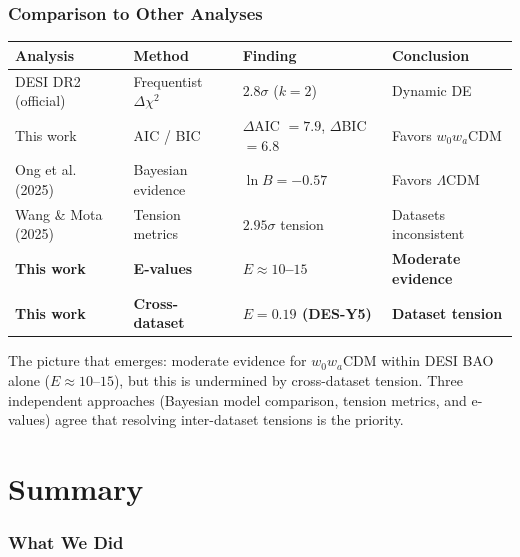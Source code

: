 \documentclass[11pt,a4paper]{article}
\newcommand{\LCDM}{$\Lambda$CDM}
\begin{document}
\section{Comparison to Other Analyses}

\begin{center}
\begin{tabular}{p{3cm}p{3cm}p{3cm}p{3cm}}
\toprule
\textbf{Analysis} & \textbf{Method} & \textbf{Finding} & \textbf{Conclusion} \\
\midrule
DESI DR2 (official) & Frequentist $\Delta\chi^2$ & $2.8\sigma$ ($k=2$) & Dynamic DE \\
This work & AIC / BIC & $\Delta$AIC $= 7.9$, $\Delta$BIC $= 6.8$ & Favors $w_0w_a$CDM \\
Ong et al. (2025) & Bayesian evidence & $\ln B = -0.57$ & Favors \LCDM \\
Wang \& Mota (2025) & Tension metrics & $2.95\sigma$ tension & Datasets inconsistent \\
\textbf{This work} & \textbf{E-values} & \textbf{$E \approx 10$--$15$} & \textbf{Moderate evidence} \\
\textbf{This work} & \textbf{Cross-dataset} & \textbf{$E = 0.19$ (DES-Y5)} & \textbf{Dataset tension} \\
\bottomrule
\end{tabular}
\end{center}

The picture that emerges: moderate evidence for $w_0w_a$CDM within DESI BAO alone ($E \approx 10$--$15$), but this is undermined by cross-dataset tension. Three independent approaches (Bayesian model comparison, tension metrics, and e-values) agree that resolving inter-dataset tensions is the priority.


\part{Summary}

\section{What We Did}
\end{document}
